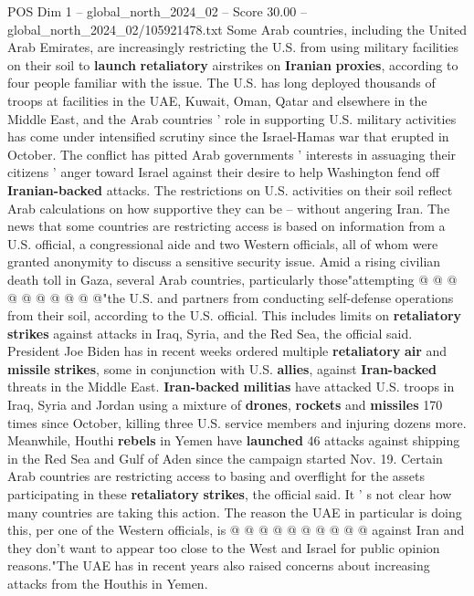 \begin{textsample}{POS Dim 1 – global\_north\_2024\_02 – Score 30.00 – global\_north\_2024\_02/105921478.txt}  \label{ex:f1_pos_271}
Some Arab countries, including the United Arab Emirates, are increasingly restricting the U.S. from using military facilities on their soil to \textbf{launch} \textbf{retaliatory} airstrikes on \textbf{Iranian} \textbf{proxies}, according to four people familiar with the issue.
The U.S. has long deployed thousands of troops at facilities in the UAE, Kuwait, Oman, Qatar and elsewhere in the Middle East, and the Arab countries ' role in supporting U.S. military activities has come under intensified scrutiny since the Israel-Hamas war that erupted in October.
The conflict has pitted Arab governments ' interests in assuaging their citizens ' anger toward Israel against their desire to help Washington fend off \textbf{Iranian-backed} attacks.
The restrictions on U.S. activities on their soil reflect Arab calculations on how supportive they can be -- without angering Iran.
The news that some countries are restricting access is based on information from a U.S. official, a congressional aide and two Western officials, all of whom were granted anonymity to discuss a sensitive security issue.
Amid a rising civilian death toll in Gaza, several Arab countries, particularly those"attempting @ @ @ @ @ @ @ @ @ @"the U.S. and partners from conducting self-defense operations from their soil, according to the U.S. official.
This includes limits on \textbf{retaliatory} \textbf{strikes} against attacks in Iraq, Syria, and the Red Sea, the official said.
President Joe Biden has in recent weeks ordered multiple \textbf{retaliatory} \textbf{air} and \textbf{missile} \textbf{strikes}, some in conjunction with U.S. \textbf{allies}, against \textbf{Iran-backed} threats in the Middle East. \textbf{Iran-backed} \textbf{militias} have attacked U.S. troops in Iraq, Syria and Jordan using a mixture of \textbf{drones}, \textbf{rockets} and \textbf{missiles} 170 times since October, killing three U.S. service members and injuring dozens more.
Meanwhile, Houthi \textbf{rebels} in Yemen have \textbf{launched} 46 attacks against shipping in the Red Sea and Gulf of Aden since the campaign started Nov. 19.
Certain Arab countries are restricting access to basing and overflight for the assets participating in these \textbf{retaliatory} \textbf{strikes}, the official said.
It ' s not clear how many countries are taking this action.
The reason the UAE in particular is doing this, per one of the Western officials, is @ @ @ @ @ @ @ @ @ @ against Iran and they don't want to appear too close to the West and Israel for public opinion reasons."The UAE has in recent years also raised concerns about increasing attacks from the Houthis in Yemen.

\end{textsample}
